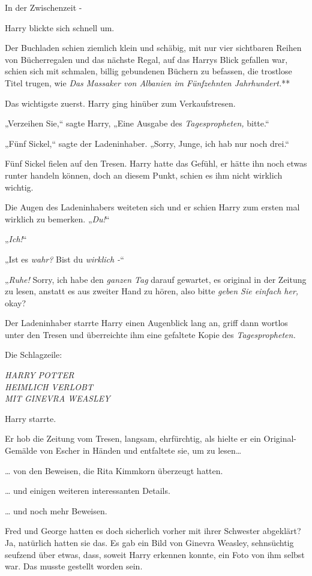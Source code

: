 {In der Zwischenzeit -

Harry blickte sich schnell um.

Der Buchladen schien ziemlich klein und schäbig, mit nur vier sichtbaren Reihen von Bücherregalen und das nächste Regal, auf das Harrys Blick gefallen war, schien sich mit schmalen, billig gebundenen Büchern zu befassen, die trostlose Titel trugen, wie \emph{Das Massaker von Albanien im Fünfzehnten Jahrhundert.}**

Das wichtigste zuerst. Harry ging hinüber zum Verkaufstresen.

„Verzeihen Sie,“ sagte Harry, „Eine Ausgabe des \emph{Tagespropheten,} bitte.“

„Fünf Sickel,“ sagte der Ladeninhaber. „Sorry, Junge, ich hab nur noch drei.“

Fünf Sickel fielen auf den Tresen. Harry hatte das Gefühl, er hätte ihn noch etwas runter handeln können, doch an diesem Punkt, schien es ihm nicht wirklich wichtig.

Die Augen des Ladeninhabers weiteten sich und er schien Harry zum ersten mal wirklich zu bemerken. „\emph{Du!}“

„\emph{Ich!}“

„Ist es \emph{wahr?} Bist du \emph{wirklich -}“

„\emph{Ruhe!} Sorry, ich habe den \emph{ganzen Tag} darauf gewartet, es original in der Zeitung zu lesen, anstatt es aus zweiter Hand zu hören, also bitte \emph{geben Sie einfach her,} okay?

Der Ladeninhaber starrte Harry einen Augenblick lang an, griff dann wortlos unter den Tresen und überreichte ihm eine gefaltete Kopie des \emph{Tagespropheten.}

Die Schlagzeile:

\emph{HARRY POTTER\\ HEIMLICH VERLOBT\\ MIT GINEVRA WEASLEY}

Harry starrte.

Er hob die Zeitung vom Tresen, langsam, ehrfürchtig, als hielte er ein Original-Gemälde von Escher in Händen und entfaltete sie, um zu lesen…

… von den Beweisen, die Rita Kimmkorn überzeugt hatten.

… und einigen weiteren interessanten Details.

… und noch mehr Beweisen.

Fred und George hatten es doch sicherlich vorher mit ihrer Schwester abgeklärt? Ja, natürlich hatten sie das. Es gab ein Bild von Ginevra Weasley, sehnsüchtig seufzend über etwas, dass, soweit Harry erkennen konnte, ein Foto von ihm selbst war. Das musste gestellt worden sein.

}
